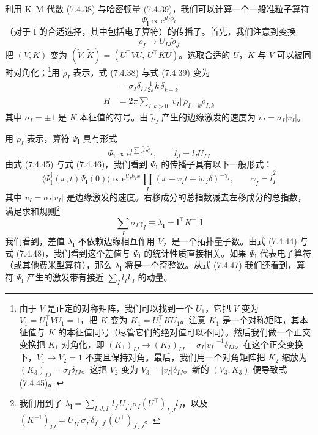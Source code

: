 利用 K--M 代数 (7.4.38) 与哈密顿量 (7.4.39)，我们可以计算一个一般准粒子算符
\begin{equation*}
\Psi_{\pmb{l}}\propto\mathrm{e}^{\mathrm{i}l_{I}\phi_{I}}
\end{equation*}
（对于 $\pmb{l}$ 的合适选择，其中包括电子算符）的传播子。首先，我们注意到变换
\begin{equation*}
\rho_{I}\rightarrow U_{IJ}\tilde{\rho}_{J}
\end{equation*}
把 $(V,K)$ 变为 $(\tilde{V},\tilde{K})=(U^{\top}VU,\,U^{\top}KU)$。选取合适的 $U$，$K$ 与 $V$ 可以被同时对角化；\footnote{由于 $V$ 是正定的对称矩阵，我们可以找到一个 $U_{1}$，它把 $V$ 变为 $V_{1}=U_{1}^{\top}VU_{1}=1$，把 $K$ 变为 $K_{1}=U_{1}^{\top}KU_{1}$。注意 $K_{1}$ 是一个对称矩阵，其本征值与 $K$ 的本征值同号（尽管它们的绝对值可以不同）。然后我们做一个正交变换把 $K_{1}$ 对角化，即 $(K_{1})_{IJ}\rightarrow(K_{2})_{IJ}=\sigma_{I}|v_{I}|^{-1}\delta_{IJ}$。在这个正交变换下，$V_{1}\rightarrow V_{2}=1$ 不变且保持对角。最后，我们用一个对角矩阵把 $K_{2}$ 缩放为 $(K_{3})_{IJ}=\sigma_{I}\delta_{IJ}$。这把 $V_{2}$ 变为 $V_{3}=|v_{I}|\delta_{IJ}$。新的 $(V_{3},K_{3})$ 便导致式 (7.4.45)。}用 $\tilde{\rho}_{I}$ 表示，式 (7.4.38) 与式 (7.4.39) 变为
\begin{align*}
[\tilde{\rho}_{Ik},\tilde{\rho}_{Jk^{\prime}}]&=\sigma_{I}\delta_{IJ}\frac{1}{2\pi}k\,\delta_{k+k^{\prime}}\\
H&=2\pi\sum_{I,k>0}|v_{I}|\,\tilde{\rho}_{I,-k}\tilde{\rho}_{I,k} \tag{7.4.45}
\end{align*}
其中 $\sigma_{I}=\pm1$ 是 $K$ 本征值的符号。由 $\tilde{\rho}_{I}$ 产生的边缘激发的速度为 $v_{I}=\sigma_{I}|v_{I}|$。

用 $\tilde{\rho}_{I}$ 表示，算符 $\Psi_{\pmb{l}}$ 具有形式
\begin{equation*}
\Psi_{\pmb{l}}\propto\mathrm{e}^{\mathrm{i}\sum_{I}\tilde{l}_{I}\tilde{\phi}_{I}},\qquad
\tilde{l}_{J}=l_{I}U_{IJ} \tag{7.4.46}
\end{equation*}
由式 (7.4.45) 与式 (7.4.46)，我们看到 $\Psi_{\pmb{l}}$ 的传播子具有以下一般形式：
\begin{equation*}
\langle\Psi_{\pmb{l}}^{\dagger}(x,t)\Psi_{\pmb{l}}(0)\rangle\propto
\mathrm{e}^{\mathrm{i}l_{I}k_{I}x}\prod_{I}(x-v_{I}t+\mathrm{i}\sigma_{I}\delta)^{-\gamma_{I}},\qquad
\gamma_{I}=\tilde{l}_{I}^{2} \tag{7.4.47}
\end{equation*}
其中 $v_{I}=\sigma_{I}|v_{I}|$ 是边缘激发的速度。右移成分的总指数减去左移成分的总指数，满足求和规则\footnote{我们用到了
$\lambda_{\pmb{l}}=\sum_{I,J,I^{\prime}}l_{I^{\prime}}U_{I^{\prime}I}\sigma_{I}(U^{\top})_{I,J}l_{J}$，以及
$(K^{-1})_{IJ}=U_{II^{\prime}}\sigma_{I^{\prime}}\delta_{I^{\prime},J^{\prime}}(U^{\top})_{J^{\prime},J}$。}
\begin{equation*}
\sum_{I}\sigma_{I}\gamma_{I}\equiv\lambda_{\pmb{l}}=\pmb{l}^{\top}K^{-1}\pmb{l} \tag{7.4.48}
\end{equation*}
我们看到，差值 $\lambda_{\pmb{l}}$ 不依赖边缘相互作用 $V$，是一个拓扑量子数。由式 (7.4.44) 与式 (7.4.48)，我们看到这个差值与 $\Psi_{\pmb{l}}$ 的统计性质直接相关。如果 $\Psi_{\pmb{l}}$ 代表电子算符（或其他费米型算符），那么 $\lambda_{\pmb{l}}$ 将是一个奇整数。从式 (7.4.47) 我们还看到，算符 $\Psi_{\pmb{l}}$ 产生的激发带有接近 $\sum_{I}l_{I}k_{I}$ 的动量。

